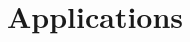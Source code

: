 \documentclass{ximera}
\title[Dig-In:]{Applications}
\begin{document}
\begin{abstract}
  
\end{abstract}
\maketitle
\end{document}
